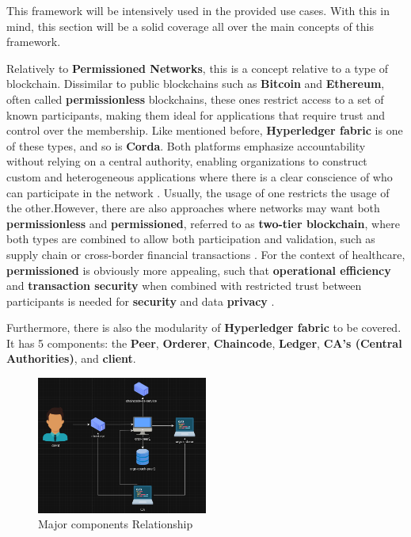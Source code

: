 This framework will be intensively used in the provided use cases. With this in mind, this section will be a solid coverage all over 
the main concepts of this framework.

Relatively to \textbf{Permissioned Networks}, this is a concept relative to a type of blockchain. Dissimilar to public blockchains 
such as \textbf{Bitcoin} and \textbf{Ethereum}, often called \textbf{permissionless} blockchains, these ones 
restrict access to a set of known participants, making them ideal for applications that require trust and control over the 
membership. Like mentioned before, \textbf{Hyperledger fabric} is one of these types, and so is \textbf{Corda}. Both 
platforms emphasize accountability without relying on a central authority, enabling organizations to construct custom 
and heterogeneous applications where there is a clear conscience of who can participate in the network \cite{permissioned-blockchains}. 
Usually, the usage of one restricts the usage of the other.However, there are also approaches where networks 
may want both \textbf{permissionless} and \textbf{permissioned}, referred to as \textbf{two-tier blockchain}, where both 
types are combined to allow both participation and validation, such as supply chain or cross-border financial 
transactions \cite{two-tier-permission-blockchains}. For the context of healthcare, \textbf{permissioned} is obviously 
more appealing, such that \textbf{operational efficiency} and \textbf{transaction security} when combined with restricted 
trust between participants is needed for \textbf{security} and data \textbf{privacy} \cite{permissioned-vs-permissionless-tradeoffs}.

Furthermore, there is also the modularity of \textbf{Hyperledger fabric} to be covered. It has 5 components: the \textbf{Peer}, 
\textbf{Orderer}, \textbf{Chaincode}, \textbf{Ledger}, \textbf{CA's (Central Authorities)}, and \textbf{client}.

\begin{figure}[H]
    \centering
    \includegraphics[width=0.5\textwidth]{assets/tools/hyperledger/hlf-minimal-setup.png} %
    \caption{Major components Relationship}
    \label{fig:sample-image} 
\end{figure}

